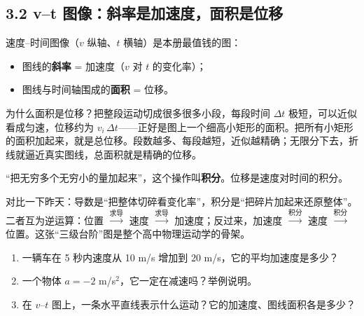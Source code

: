 \documentclass[UTF8,a4paper,11pt]{ctexart}
\begin{document}
\subsection*{3.2 v–t 图像：斜率是加速度，面积是位移}

速度–时间图像（$v$ 纵轴、$t$ 横轴）是本册最值钱的图：

\begin{itemize}
  \item 图线的\textbf{斜率} = 加速度（$v$ 对 $t$ 的变化率）；
  \item 图线与时间轴围成的\textbf{面积} = 位移。
\end{itemize}

\begin{center}
\end{center}

为什么面积是位移？把整段运动切成很多很多小段，每段时间 $\Delta t$ 极短，可以近似看成匀速，位移约为 $v_i\,\Delta t$——正好是图上一个细高小矩形的面积。把所有小矩形的面积加起来，就是总位移。段数越多、每段越短，近似越精确；无限分下去，折线就逼近真实图线，总面积就是精确的位移。

\begin{calcbox}[微积分初步（下）：积分]
“把无穷多个无穷小的量加起来”，这个操作叫\textbf{积分}。位移是速度对时间的积分。

对比一下昨天：导数是“把整体切碎看变化率”，积分是“把碎片加起来还原整体”。二者互为逆运算：位置 $\xrightarrow{\text{求导}}$ 速度 $\xrightarrow{\text{求导}}$ 加速度；反过来，加速度 $\xrightarrow{\text{积分}}$ 速度 $\xrightarrow{\text{积分}}$ 位置。这张“三级台阶”图是整个高中物理运动学的骨架。
\end{calcbox}

\begin{exercise}[今日自测]
\begin{enumerate}
  \item 一辆车在 5 秒内速度从 10 m/s 增加到 20 m/s，它的平均加速度是多少？
  \item 一个物体 $a = -2$ m/s$^2$，它一定在减速吗？举例说明。
  \item 在 $v$–$t$ 图上，一条水平直线表示什么运动？它的加速度、图线面积各是多少？
\end{enumerate}
\end{exercise}
\end{document}
